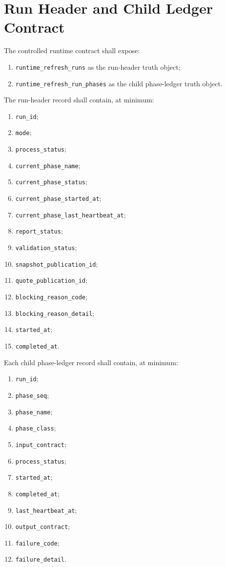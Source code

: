 \section{Run Header and Child Ledger Contract}
The controlled runtime contract shall expose:
\begin{enumerate}[leftmargin=1.2cm]
    \item \texttt{runtime\_refresh\_runs} as the run-header truth object;
    \item \texttt{runtime\_refresh\_run\_phases} as the child phase-ledger truth object.
\end{enumerate}

The run-header record shall contain, at minimum:
\begin{enumerate}[leftmargin=1.2cm]
    \item \texttt{run\_id};
    \item \texttt{mode};
    \item \texttt{process\_status};
    \item \texttt{current\_phase\_name};
    \item \texttt{current\_phase\_status};
    \item \texttt{current\_phase\_started\_at};
    \item \texttt{current\_phase\_last\_heartbeat\_at};
    \item \texttt{report\_status};
    \item \texttt{validation\_status};
    \item \texttt{snapshot\_publication\_id};
    \item \texttt{quote\_publication\_id};
    \item \texttt{blocking\_reason\_code};
    \item \texttt{blocking\_reason\_detail};
    \item \texttt{started\_at};
    \item \texttt{completed\_at}.
\end{enumerate}

Each child phase-ledger record shall contain, at minimum:
\begin{enumerate}[leftmargin=1.2cm]
    \item \texttt{run\_id};
    \item \texttt{phase\_seq};
    \item \texttt{phase\_name};
    \item \texttt{phase\_class};
    \item \texttt{input\_contract};
    \item \texttt{process\_status};
    \item \texttt{started\_at};
    \item \texttt{completed\_at};
    \item \texttt{last\_heartbeat\_at};
    \item \texttt{output\_contract};
    \item \texttt{failure\_code};
    \item \texttt{failure\_detail}.
\end{enumerate}

